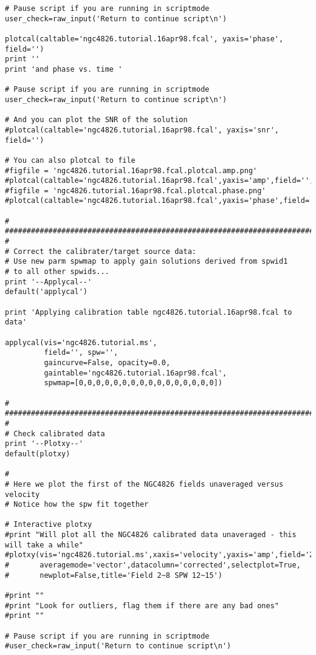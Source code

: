 \begin{verbatim}
# Pause script if you are running in scriptmode
user_check=raw_input('Return to continue script\n')

plotcal(caltable='ngc4826.tutorial.16apr98.fcal', yaxis='phase', field='')
print ''
print 'and phase vs. time '

# Pause script if you are running in scriptmode
user_check=raw_input('Return to continue script\n')

# And you can plot the SNR of the solution
#plotcal(caltable='ngc4826.tutorial.16apr98.fcal', yaxis='snr', field='')

# You can also plotcal to file
#figfile = 'ngc4826.tutorial.16apr98.fcal.plotcal.amp.png'
#plotcal(caltable='ngc4826.tutorial.16apr98.fcal',yaxis='amp',field='',showgui=False,figfile=figfile)
#figfile = 'ngc4826.tutorial.16apr98.fcal.plotcal.phase.png'
#plotcal(caltable='ngc4826.tutorial.16apr98.fcal',yaxis='phase',field='',showgui=False,figfile=figfile)

#
##########################################################################
#
# Correct the calibrater/target source data:
# Use new parm spwmap to apply gain solutions derived from spwid1
# to all other spwids... 
print '--Applycal--'
default('applycal')

print 'Applying calibration table ngc4826.tutorial.16apr98.fcal to data'

applycal(vis='ngc4826.tutorial.ms',
         field='', spw='',
         gaincurve=False, opacity=0.0, 
         gaintable='ngc4826.tutorial.16apr98.fcal',
         spwmap=[0,0,0,0,0,0,0,0,0,0,0,0,0,0,0,0])

#
##########################################################################
#
# Check calibrated data
print '--Plotxy--'
default(plotxy)

#
# Here we plot the first of the NGC4826 fields unaveraged versus velocity
# Notice how the spw fit together

# Interactive plotxy
#print "Will plot all the NGC4826 calibrated data unaveraged - this will take a while"
#plotxy(vis='ngc4826.tutorial.ms',xaxis='velocity',yaxis='amp',field='2~8',spw='12~15',
#       averagemode='vector',datacolumn='corrected',selectplot=True,
#       newplot=False,title='Field 2~8 SPW 12~15')

#print ""
#print "Look for outliers, flag them if there are any bad ones"
#print ""
        
# Pause script if you are running in scriptmode
#user_check=raw_input('Return to continue script\n')


\end{verbatim}
